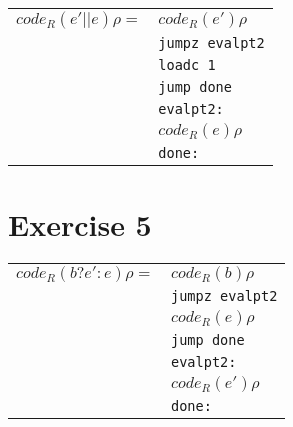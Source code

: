 \documentclass[10pt,a4paper]{article}
\begin{document}
	\begin{tabular}{l l}
		$code_R(e' || e) \rho = $ & $code_R(e') \rho$\\
		& \texttt{jumpz evalpt2} \\
		& \texttt{loadc 1} \\
		& \texttt{jump done} \\
		& \texttt{evalpt2:} \\
		& $code_R(e) \rho$ \\
		& \texttt{done:} \\
	\end{tabular}
	
	\section{Exercise 5}
	
	\begin{tabular}{l l}
		$code_R(b ? e' : e) \rho = $ & $code_R(b) \rho$ \\
		& \texttt{jumpz evalpt2} \\
		& $code_R(e) \rho$ \\
		& \texttt{jump done} \\
		& \texttt{evalpt2:} \\
		& $code_R(e') \rho$ \\
		& \texttt{done:} \\
	\end{tabular}
\end{document}

